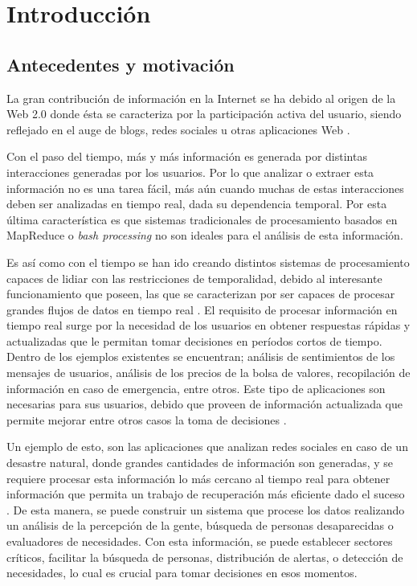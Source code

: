 \chapter{Introducción}
\label{cap:introduccion}

\section{Antecedentes y motivación}
\label{intro:motivacion}

La gran contribución de información en la Internet se ha debido al origen de la Web 2.0 donde ésta se caracteriza por la participación activa del usuario, siendo reflejado en el auge de blogs, redes sociales u otras aplicaciones Web \citep{web2007oberhelman}.


Con el paso del tiempo, más y más información es generada por distintas interacciones generadas por los usuarios. Por lo que analizar o extraer esta información no es una tarea fácil, más aún cuando muchas de estas interacciones deben ser analizadas en tiempo real, dada su dependencia temporal. Por esta última característica es que sistemas tradicionales de procesamiento basados en MapReduce \citep{2010Lin} o \textit{bash processing} \citep{HawwashN14} no son ideales para el análisis de esta información.

Es así como con el tiempo se han ido creando distintos sistemas de procesamiento capaces de lidiar con las restricciones de temporalidad, debido al interesante funcionamiento que poseen, las que se caracterizan por ser capaces de procesar grandes flujos de datos en tiempo real \citep{ChenZ14a}. El requisito de procesar informaci\'on en tiempo real surge por la necesidad de los usuarios en obtener respuestas r\'apidas y actualizadas que le permitan tomar decisiones en per\'iodos cortos de tiempo. Dentro de los ejemplos existentes se encuentran; análisis de sentimientos de los mensajes de usuarios, análisis de los precios de la bolsa de valores, recopilación de información en caso de emergencia, entre otros. Este tipo de aplicaciones son necesarias para sus usuarios, debido que proveen de información actualizada que permite mejorar entre otros casos la toma de decisiones \citep{Wenzel14}.

Un ejemplo de esto, son las aplicaciones que analizan redes sociales en caso de un desastre natural, donde grandes cantidades de información son generadas, y se requiere procesar esta información lo más cercano al tiempo real para obtener información que permita un trabajo de recuperación más eficiente dado el suceso \citep{andrade2014fundamentals}. De esta manera, se puede construir un sistema que procese los datos realizando un análisis de la percepción de la gente, búsqueda de personas desaparecidas o evaluadores de necesidades. Con esta información, se puede establecer sectores críticos, facilitar la búsqueda de personas, distribución de alertas, o detección de necesidades, lo cual es crucial para tomar decisiones en esos momentos.

